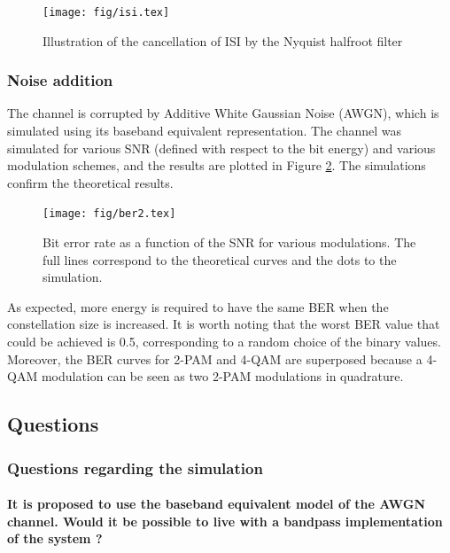 \begin{figure}[H]
\centering
    \texttt{[image: fig/isi.tex]}
     \caption{Illustration of the cancellation of ISI by the Nyquist halfroot filter}
    \label{fig:isi}
\end{figure}


\subsubsection{Noise addition}

The channel is corrupted by Additive White Gaussian Noise (AWGN), which is simulated using its baseband equivalent representation. The channel was simulated for various SNR (defined with respect to the bit energy) and various modulation schemes, and the results are plotted in Figure \ref{fig:ber}. The simulations confirm the theoretical results.


\begin{figure}[H]
\centering
    \texttt{[image: fig/ber2.tex]}
    \caption{Bit error rate as a function of the SNR for various modulations. The full lines correspond to the theoretical curves and the dots to the simulation.}
    \label{fig:ber}
\end{figure}

As expected, more energy is required to have the same BER when the constellation size is increased. It is worth noting that the worst BER value that could be achieved is 0.5, corresponding to a random choice of the binary values. Moreover, the BER curves for 2-PAM and 4-QAM are superposed because a 4-QAM modulation can be seen as two 2-PAM modulations in quadrature.



\newpage
\subsection{Questions}

\subsubsection{Questions regarding the simulation}

\paragraph{It is proposed to use the baseband equivalent model of the AWGN channel. Would it be possible to live with a bandpass implementation of the system ?} \mbox{}

